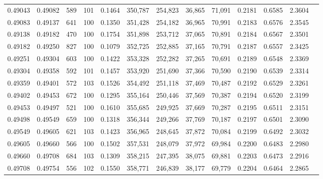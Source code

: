 \begin{tabular}{rrrrrrrrrrrrr}
0.49043 & 0.49082 &   589 & 101 &                                     0.1464 & 350,787 & 254,823 &  36,865 &  71,091 & 0.2181 & 0.6585 & 2.3604 \\
0.49083 & 0.49137 &   641 & 100 &                                     0.1350 & 351,428 & 254,182 &  36,965 &  70,991 & 0.2183 & 0.6576 & 2.3545 \\
0.49138 & 0.49182 &   470 & 100 &                                     0.1754 & 351,898 & 253,712 &  37,065 &  70,891 & 0.2184 & 0.6567 & 2.3501 \\
0.49182 & 0.49250 &   827 & 100 &                                     0.1079 & 352,725 & 252,885 &  37,165 &  70,791 & 0.2187 & 0.6557 & 2.3425 \\
0.49251 & 0.49304 &   603 & 100 &                                     0.1422 & 353,328 & 252,282 &  37,265 &  70,691 & 0.2189 & 0.6548 & 2.3369 \\
0.49304 & 0.49358 &   592 & 101 &                                     0.1457 & 353,920 & 251,690 &  37,366 &  70,590 & 0.2190 & 0.6539 & 2.3314 \\
0.49359 & 0.49401 &   572 & 103 &                                     0.1526 & 354,492 & 251,118 &  37,469 &  70,487 & 0.2192 & 0.6529 & 2.3261 \\
0.49402 & 0.49453 &   672 & 100 &                                     0.1295 & 355,164 & 250,446 &  37,569 &  70,387 & 0.2194 & 0.6520 & 2.3199 \\
0.49453 & 0.49497 &   521 & 100 &                                     0.1610 & 355,685 & 249,925 &  37,669 &  70,287 & 0.2195 & 0.6511 & 2.3151 \\
0.49498 & 0.49549 &   659 & 100 &                                     0.1318 & 356,344 & 249,266 &  37,769 &  70,187 & 0.2197 & 0.6501 & 2.3090 \\
0.49549 & 0.49605 &   621 & 103 &                                     0.1423 & 356,965 & 248,645 &  37,872 &  70,084 & 0.2199 & 0.6492 & 2.3032 \\
0.49605 & 0.49660 &   566 & 100 &                                     0.1502 & 357,531 & 248,079 &  37,972 &  69,984 & 0.2200 & 0.6483 & 2.2980 \\
0.49660 & 0.49708 &   684 & 103 &                                     0.1309 & 358,215 & 247,395 &  38,075 &  69,881 & 0.2203 & 0.6473 & 2.2916 \\
0.49708 & 0.49754 &   556 & 102 &                                     0.1550 & 358,771 & 246,839 &  38,177 &  69,779 & 0.2204 & 0.6464 & 2.2865 \\

\end{tabular}
